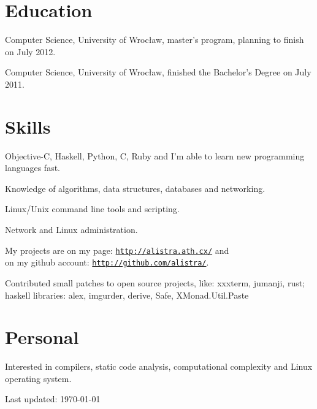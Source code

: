 \documentclass[letterpaper]{article}
\def\footerlink{}
\renewenvironment{itemize}{
  \begin{list}{}{
    \setlength{\leftmargin}{1.5em}
  }
}{
  \end{list}
}
\begin{document}
\section*{Education}

\begin{itemize}
  	\item Computer Science, University of Wrocław, master's program, planning to finish on July 2012.
  	\item Computer Science, University of Wrocław, finished the Bachelor's Degree on July 2011.
\end{itemize}

\section*{Skills}
\begin{itemize}
	\item Objective-C, Haskell, Python, C, Ruby and I'm able to learn new programming languages fast.
	\item Knowledge of algorithms, data structures, databases and networking.
	\item Linux/Unix command line tools and scripting.
	\item Network and Linux administration.
	\item My projects are on my page: \href{http://alistra.ath.cx/}{\tt http://alistra.ath.cx/} and \\
		 on my github account: \href{http://github.com/alistra/}{\tt http://github.com/alistra/}.
	\item Contributed small patches to open source projects, like: xxxterm, jumanji, rust;\\
		 haskell libraries: alex, imgurder, derive, Safe, XMonad.Util.Paste
\end{itemize}

\section*{Personal}

\begin{itemize}
	\item Interested in compilers, static code analysis, computational complexity and Linux operating system.
\end{itemize}

\bigskip

\begin{center}
  \begin{footnotesize}
    Last updated: \today \\
    \href{\footerlink}{\texttt{\footerlink}}
  \end{footnotesize}
\end{center}
\end{document}
